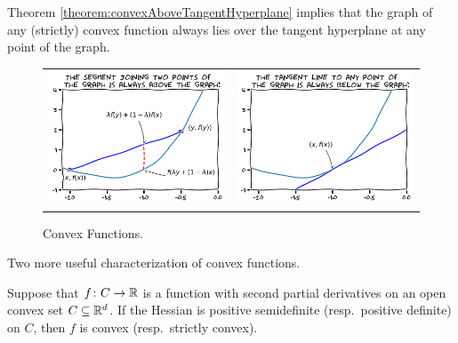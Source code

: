 \begin{remark}
Theorem \ref{theorem:convexAboveTangentHyperplane} implies that the graph of any (strictly) convex function always lies over the tangent hyperplane at any point of the graph.
\begin{figure}[ht!]
\begin{tabular}{cc}
\includegraphics[width=0.5\linewidth]{images/convexFunction1.png} &
\includegraphics[width=0.5\linewidth]{images/convexFunction2.png}
\end{tabular}
\caption{Convex Functions.}
\label{figure:convexFunction}
\end{figure}
\end{remark}

Two more useful characterization of convex functions.
\begin{theorem}\label{theorem:Hess4Convex}
Suppose that $f\colon C \to \mathbb{R}$ is a function with second partial derivatives on an open convex set $C \subseteq \mathbb{R}^d$.  If the Hessian is positive semidefinite (resp.~positive definite) on $C$, then $f$ is convex (resp.~strictly convex).
\end{theorem}

